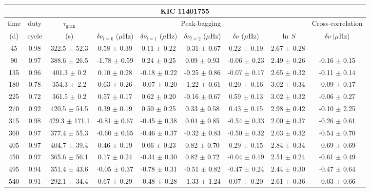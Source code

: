 \documentclass[twocolumn]{aastex61}%
\begin{document}
\begin{table*}[ht]\centering\fontsize{9.}{7.}\selectfont
\begin{tabular}{ccc|ccccc|c}
\multicolumn{9}{c}{KIC 11401755}\\ \hline\hline
time & duty & $\tau_\text{gran}$ &\multicolumn{5}{c|}{Peak-bagging}&Cross-correlation\\
(d)& cycle & (s)&$\delta\nu_{l=0}$ ($\mu$Hz) & $\delta\nu_{l=1}$ ($\mu$Hz) & $\delta\nu_{l=2}$ ($\mu$Hz) & $\delta\nu$ ($\mu$Hz)& $\ln\,S$ & $\delta\nu\,(\mu$Hz)\\\hline
45 & 0.98 & 322.5 $\pm$ 52.3 & 0.58 $\pm$ 0.39 & 0.11 $\pm$ 0.22 & -0.31 $\pm$ 0.67 & 0.22 $\pm$ 0.19 & 2.67 $\pm$ 0.28 & --\\
90 & 0.97 & 388.6 $\pm$ 26.5 & -1.78 $\pm$ 0.59 & 0.24 $\pm$ 0.25 & 0.09 $\pm$ 0.93 & -0.06 $\pm$ 0.23 & 2.49 $\pm$ 0.26 & -0.16 $\pm$ 0.15\\
135 & 0.96 & 401.3 $\pm$ 0.2 & 0.10 $\pm$ 0.28 & -0.18 $\pm$ 0.22 & -0.25 $\pm$ 0.86 & -0.07 $\pm$ 0.17 & 2.65 $\pm$ 0.32 & -0.11 $\pm$ 0.14\\
180 & 0.78 & 354.3 $\pm$ 2.2 & 0.63 $\pm$ 0.26 & -0.07 $\pm$ 0.20 & -1.22 $\pm$ 0.61 & 0.20 $\pm$ 0.16 & 3.02 $\pm$ 0.34 & -0.09 $\pm$ 0.17\\
225 & 0.72 & 361.5 $\pm$ 0.2 & 0.57 $\pm$ 0.17 & 0.62 $\pm$ 0.20 & -0.16 $\pm$ 0.67 & 0.59 $\pm$ 0.13 & 3.02 $\pm$ 0.32 & -0.06 $\pm$ 0.27\\
270 & 0.92 & 420.5 $\pm$ 54.5 & 0.39 $\pm$ 0.19 & 0.50 $\pm$ 0.25 & 0.33 $\pm$ 0.58 & 0.43 $\pm$ 0.15 & 2.98 $\pm$ 0.42 & -0.10 $\pm$ 2.25\\
315 & 0.98 & 429.3 $\pm$ 171.1 & -0.81 $\pm$ 0.67 & -0.45 $\pm$ 0.38 & 0.04 $\pm$ 0.85 & -0.54 $\pm$ 0.33 & 2.00 $\pm$ 0.37 & -0.26 $\pm$ 0.61\\
360 & 0.97 & 377.4 $\pm$ 55.3 & -0.60 $\pm$ 0.65 & -0.46 $\pm$ 0.37 & -0.32 $\pm$ 0.83 & -0.50 $\pm$ 0.32 & 2.03 $\pm$ 0.32 & -0.54 $\pm$ 0.70\\
405 & 0.97 & 404.7 $\pm$ 39.4 & 0.46 $\pm$ 0.19 & 0.06 $\pm$ 0.23 & 0.82 $\pm$ 0.70 & 0.29 $\pm$ 0.15 & 2.84 $\pm$ 0.34 & -0.69 $\pm$ 0.69\\
450 & 0.97 & 365.6 $\pm$ 56.1 & 0.17 $\pm$ 0.24 & -0.34 $\pm$ 0.30 & 0.82 $\pm$ 0.72 & -0.04 $\pm$ 0.19 & 2.51 $\pm$ 0.24 & -0.61 $\pm$ 0.49\\
495 & 0.94 & 351.4 $\pm$ 43.6 & -0.05 $\pm$ 0.37 & -0.78 $\pm$ 0.31 & -0.51 $\pm$ 0.82 & -0.47 $\pm$ 0.24 & 2.44 $\pm$ 0.30 & -0.47 $\pm$ 0.64\\
540 & 0.91 & 292.1 $\pm$ 34.4 & 0.67 $\pm$ 0.29 & -0.48 $\pm$ 0.28 & -1.33 $\pm$ 1.24 & 0.07 $\pm$ 0.20 & 2.61 $\pm$ 0.36 & -0.03 $\pm$ 0.66\\

\end{tabular}
\end{table*}
\end{document}
